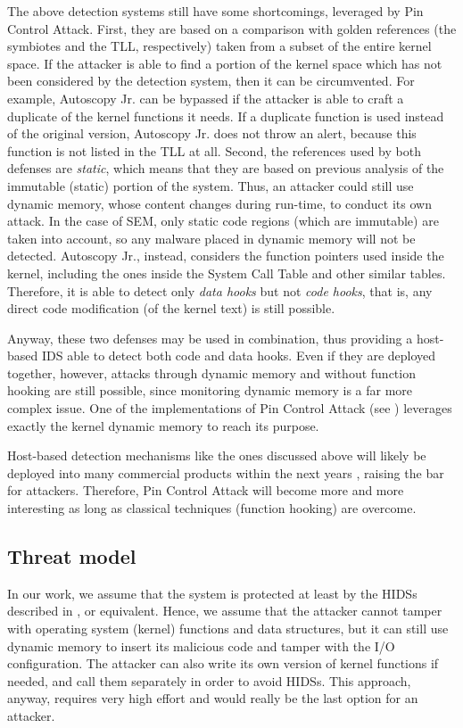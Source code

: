 The above detection systems still have some shortcomings, leveraged by Pin Control Attack.
First, they are based on a comparison with golden references (the symbiotes and the TLL, respectively) taken from a subset of the entire kernel space.
If the attacker is able to find a portion of the kernel space which has not been considered by the detection system, then it can be circumvented.
For example, Autoscopy Jr. can be bypassed if the attacker is able to craft a duplicate of the kernel functions it needs.
If a duplicate function is used instead of the original version, Autoscopy Jr. does not throw an alert, because this function is not listed in the TLL at all.
Second, the references used by both defenses are \emph{static}, which means that they are based on previous analysis of the immutable (static) portion of the system.
Thus, an attacker could still use dynamic memory, whose content changes during run-time, to conduct its own attack.
In the case of SEM, only static code regions (which are immutable) are taken into account, so any malware placed in dynamic memory will not be detected.
Autoscopy Jr., instead, considers the function pointers used inside the kernel, including the ones inside the System Call Table and other similar tables.
Therefore, it is able to detect only \emph{data hooks} but not \emph{code hooks}, that is, any direct code modification (\eg of the kernel text) is still possible.

Anyway, these two defenses may be used in combination, thus providing a host-based IDS able to detect both code and data hooks.
Even if they are deployed together, however, attacks through dynamic memory and without function hooking are still possible,
since monitoring dynamic memory is a far more complex issue. One of the implementations of Pin Control Attack (see )
leverages exactly the kernel dynamic memory to reach its purpose.

Host-based detection mechanisms like the ones discussed above will likely be deployed into many commercial products within the next years \cite{symbiote_web, autoscopy_web},
raising the bar for attackers. Therefore, Pin Control Attack will become more and more interesting as long as classical techniques (\eg function hooking) are overcome.


\subsection{Threat model}
\label{sec:threat_model}

In our work, we assume that the system is protected at least by the HIDSs described in , or equivalent.
Hence, we assume that the attacker cannot tamper with operating system (kernel) functions and data structures, but it can still use dynamic memory to insert its malicious code
and tamper with the I/O configuration. The attacker can also write its own version of kernel functions if needed, and call them separately in order to avoid HIDSs.
This approach, anyway, requires very high effort and would really be the last option for an attacker.

